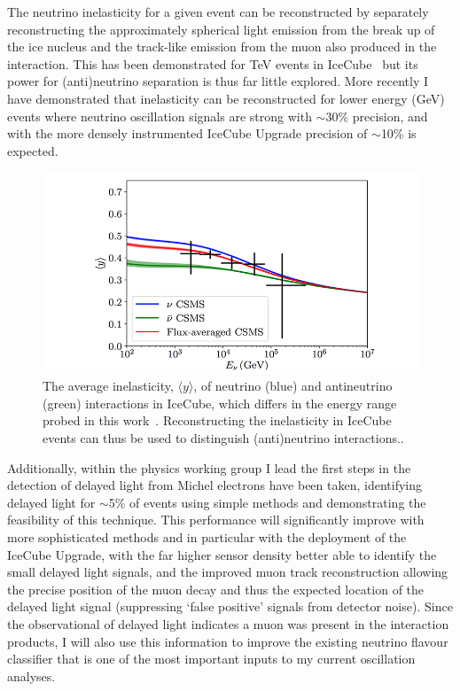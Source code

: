 \documentclass[a4paper,11pt]{article}
\begin{document}
The neutrino inelasticity for a given event can be reconstructed by separately reconstructing the approximately spherical light emission from the break up of the ice nucleus and the track-like emission from the muon also produced in the interaction. This has been demonstrated for TeV events in IceCube~\cite{Aartsen:2018vez} but its power for (anti)neutrino separation is thus far little explored. More recently I have demonstrated that inelasticity can be reconstructed for lower energy (GeV) events where neutrino oscillation signals are strong with $\sim$30\% precision, and with the more densely instrumented IceCube Upgrade precision of $\sim$10\% is expected. 

\begin{figure} %
    \centering
    \includegraphics[trim=2.0cm 0.0cm 1.0cm 0.0cm, clip=true, width=\linewidth]{images/inelasticity.png}
    \caption{The average inelasticity, $\langle y \rangle$, of neutrino (blue) and antineutrino (green) interactions in IceCube, which differs in the energy range probed in this work~\cite{Aartsen:2018vez}. Reconstructing the inelasticity in IceCube events can thus be used to distinguish (anti)neutrino interactions..}
    \label{fig:inelasticity}
\end{figure}

Additionally, within the physics working group I lead the first steps in the detection of delayed light from Michel electrons have been taken, identifying delayed light for $\sim$5\% of events using simple methods and demonstrating the feasibility of this technique. This performance will significantly improve with more sophisticated methods and in particular with the deployment of the IceCube Upgrade, with the far higher sensor density better able to identify the small delayed light signals, and the improved muon track reconstruction allowing the precise position of the muon decay and thus the expected location of the delayed light signal (suppressing `false positive' signals from detector noise). Since the observational of delayed light indicates a muon was present in the interaction products, I will also use this information to improve the existing neutrino flavour classifier that is one of the most important inputs to my current oscillation analyses. 
\end{document}
